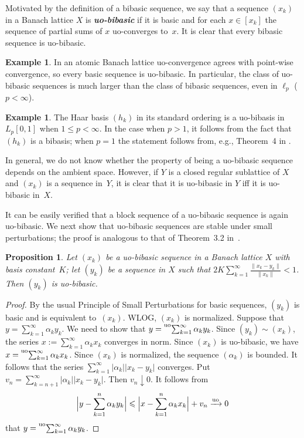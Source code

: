 \documentclass[12pt]{amsart}
\theoremstyle{plain}
\newtheorem{proposition}[theorem]{Proposition}
\theoremstyle{definition}
\newtheorem{example}[theorem]{Example}
\newcommand{\abs}[1]{\lvert#1\rvert}
\newcommand{\norm}[1]{\lVert#1\rVert}
\newcommand{\Bigabs}[1]{\Bigl\lvert#1\Bigr\rvert}
\newcommand{\term}[1]{{\textit{\textbf{#1}}}}   %
\newcommand{\goesuo}{\xrightarrow{\mathrm{uo}}}	%
\newcommand{\s}{\sum_{k=1}^\infty}
\newcommand{\tuos}{\prescript{{\rm uo}}{}{\sum_{k=1}^\infty\,}}
\renewcommand{\le}{\leqslant}
\begin{document}
Motivated by the definition of a bibasic sequence, we say that a
sequence $(x_k)$ in a Banach lattice $X$ is \term{uo-bibasic} if it is basic
and for each $x\in [x_k]$ the sequence
of partial sums of $x$ uo-converges to~$x$. It is clear that every bibasic
sequence is uo-bibasic.

\begin{example}
In an atomic Banach lattice uo-convergence agrees with point-wise convergence, so every basic sequence is uo-bibasic. In particular,
  the class of uo-bibasic sequences is much larger than the class of
  bibasic sequences, even in $\ell_p$ ($p<\infty$). 
\end{example}

\begin{example}
  The Haar basis $(h_k)$ in its standard ordering is a uo-bibasis in
  $L_p[0,1]$ when $1\le p<\infty$.  In the case when $p>1$, it follows
  from the fact that $(h_k)$ is a bibasis; when $p=1$ the statement
  follows from, e.g., Theorem~4 in \cite[p.~68]{Kashin:89}.
\end{example}

In general, we do not know whether the property of being a uo-bibasic
sequence depends on the ambient space. However, if $Y$ is a closed
regular sublattice of $X$ and $(x_k)$ is a sequence in~$Y$, it is
clear that it is uo-bibasic in $Y$ iff it is uo-bibasic in~$X$.

It can be easily verified that a block sequence of a uo-bibasic
sequence is again uo-bibasic.  We next show that uo-bibasic
sequences are stable under small perturbations; the proof is analogous
to that of Theorem~3.2 in~\cite{Gumenchuk:15}.

\begin{proposition}
  Let $(x_k)$ be a uo-bibasic sequence in a Banach lattice $X$ with
  basis constant~$K$; let $(y_k)$ be a sequence in $X$ such that
  $2K\s\frac{\norm{x_k-y_k}}{\norm{x_k}}<1$. Then $(y_k)$ is uo-bibasic.
\end{proposition}

\begin{proof}
  By the usual Principle of Small Perturbations for basic sequences,
  $(y_k)$ is basic and is equivalent to~$(x_k)$. WLOG, $(x_k)$ is
  normalized.  Suppose that $y=\s\alpha_ky_k$. We need to show that
  $y=\tuos\alpha_ky_k$. Since $(y_k)\sim(x_k)$, the series
  $x:=\s\alpha_kx_k$ converges in norm.  Since $(x_k)$ is uo-bibasic,
  we have $x=\tuos\alpha_kx_k$. Since $(x_k)$ is normalized, the
  sequence $(\alpha_k)$ is bounded. It follows that the series
  $\s\abs{\alpha_k}\abs{x_k-y_k}$ converges. Put
  $v_n=\sum_{k=n+1}^\infty\abs{\alpha_k}\abs{x_k-y_k}$. Then
  $v_n\downarrow 0$. It follows from
  \begin{displaymath}
    \Bigabs{y-\sum_{k=1}^n\alpha_ky_k}
    \le\Bigabs{x-\sum_{k=1}^n\alpha_kx_k}
    +v_n\goesuo 0
  \end{displaymath}
  that $y=\tuos\alpha_ky_k$.
\end{proof}
\end{document}

